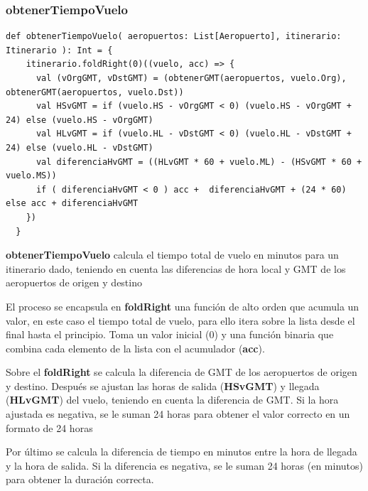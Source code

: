\documentclass[letterpaper]{article}
\begin{document}
\subsubsection{obtenerTiempoVuelo}
\begin{lstlisting}[caption={Función para el tiempo de vuelo}, label={lst:obtenerTiempoVuelo}, captionpos=b]
  def obtenerTiempoVuelo( aeropuertos: List[Aeropuerto], itinerario: Itinerario ): Int = {    
    itinerario.foldRight(0)((vuelo, acc) => {
      val (vOrgGMT, vDstGMT) = (obtenerGMT(aeropuertos, vuelo.Org), obtenerGMT(aeropuertos, vuelo.Dst))
      val HSvGMT = if (vuelo.HS - vOrgGMT < 0) (vuelo.HS - vOrgGMT + 24) else (vuelo.HS - vOrgGMT)
      val HLvGMT = if (vuelo.HL - vDstGMT < 0) (vuelo.HL - vDstGMT + 24) else (vuelo.HL - vDstGMT)
      val diferenciaHvGMT = ((HLvGMT * 60 + vuelo.ML) - (HSvGMT * 60 + vuelo.MS))
      if ( diferenciaHvGMT < 0 ) acc +  diferenciaHvGMT + (24 * 60) else acc + diferenciaHvGMT
    })
  }
\end{lstlisting}
\textbf{obtenerTiempoVuelo} calcula el tiempo total de vuelo en minutos para un itinerario dado, teniendo en cuenta las diferencias de hora local y GMT de los aeropuertos de origen y destino

El proceso se encapsula en \textbf{foldRight} una función de alto orden que acumula un valor, en este caso el tiempo total de vuelo, para ello itera sobre la lista desde el final hasta el principio. Toma un valor inicial (0) y una función binaria que combina cada elemento de la lista con el acumulador (\textbf{acc}).

Sobre el \textbf{foldRight} se calcula la diferencia de GMT de los aeropuertos de origen y destino. Después se ajustan las horas de salida (\textbf{HSvGMT}) y llegada (\textbf{HLvGMT}) del vuelo,  teniendo en cuenta la diferencia de GMT. Si la hora ajustada es negativa, se le suman 24 horas para obtener el valor correcto en un formato de 24 horas

Por último se calcula la diferencia de tiempo en minutos entre la hora de llegada y la hora de salida. Si la diferencia es negativa, se le suman 24 horas (en minutos) para obtener la duración correcta.
\end{document}

